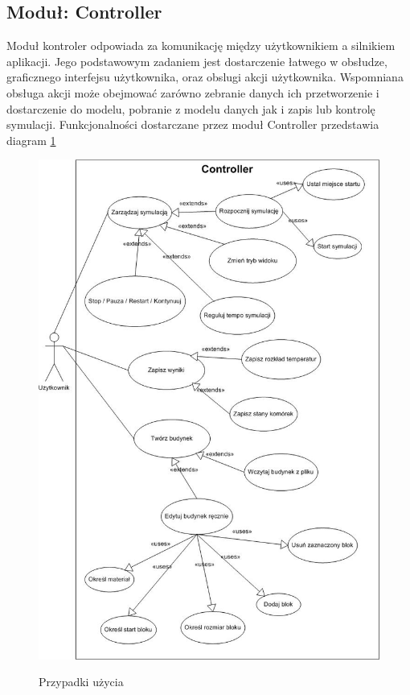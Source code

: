 \subsection{Moduł: Controller}
Moduł kontroler odpowiada za komunikację między użytkownikiem a silnikiem aplikacji. 
Jego podstawowym zadaniem jest dostarczenie łatwego w obsłudze, graficznego interfejsu użytkownika, oraz 
obslugi akcji użytkownika. Wspomniana obsługa akcji może obejmować zarówno zebranie danych ich przetworzenie
i dostarczenie do modelu, pobranie z modelu danych jak i zapis lub kontrolę symulacji.
Funkcjonalności dostarczane przez moduł Controller przedstawia diagram \ref{przypadki uzycia}
\begin{figure}
\begin {center}
\includegraphics{useCase.jpg} \\
\caption { Przypadki użycia}
\label {przypadki uzycia}
\end {center}
\end{figure}

